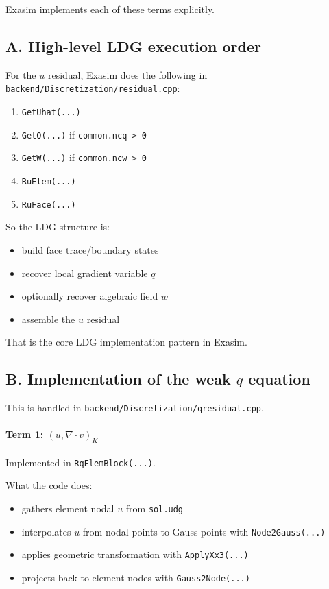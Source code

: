 \documentclass[11pt]{article}
\begin{document}
Exasim implements each of these terms explicitly.

\subsection*{A. High-level LDG execution order}

For the $u$ residual, Exasim does the following in
\texttt{backend/Discretization/residual.cpp}:

\begin{enumerate}[leftmargin=*]
\item \texttt{GetUhat(...)}
\item \texttt{GetQ(...)} if \texttt{common.ncq > 0}
\item \texttt{GetW(...)} if \texttt{common.ncw > 0}
\item \texttt{RuElem(...)}
\item \texttt{RuFace(...)}
\end{enumerate}

So the LDG structure is:

\begin{itemize}[leftmargin=*]
\item build face trace/boundary states
\item recover local gradient variable $q$
\item optionally recover algebraic field $w$
\item assemble the $u$ residual
\end{itemize}

That is the core LDG implementation pattern in Exasim.

\subsection*{B. Implementation of the weak $q$ equation}

This is handled in \texttt{backend/Discretization/qresidual.cpp}.

\paragraph{Term 1: $(u, \nabla \cdot v)_K$}

Implemented in \texttt{RqElemBlock(...)}.

What the code does:

\begin{itemize}[leftmargin=*]
\item gathers element nodal $u$ from \texttt{sol.udg}
\item interpolates $u$ from nodal points to Gauss points with
\texttt{Node2Gauss(...)}
\item applies geometric transformation with \texttt{ApplyXx3(...)}
\item projects back to element nodes with \texttt{Gauss2Node(...)}
\end{itemize}
\end{document}
